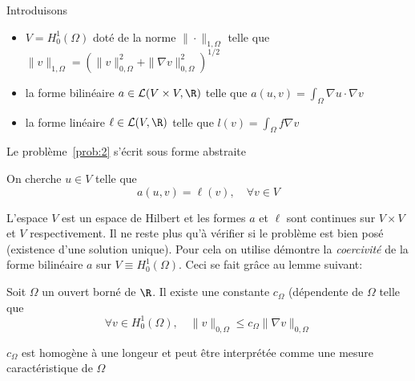 Introduisons
\begin{itemize}
\item $V = H^1_0(\Omega)$ doté de la norme $\|\cdot\|_{1,\Omega}$ telle que
  $\|v\|_{1,\Omega} = (\|v\|^2_{0,\Omega} + \|\nabla v\|^2_{0,\Omega})^{1/2}$
\item la forme bilinéaire $a \in \mathcal{L}(V \times V, \R)$ telle que $a(u,v) = \int_\Omega
  \nabla u \cdot \nabla v $
\item la forme linéaire $\ell \in \mathcal{L}(V, \R)$ telle que $l(v) = \int_\Omega
  f \nabla v $
\end{itemize}

Le problème~\ref{prob:2} s'écrit sous forme abstraite
\begin{problem}
  \label{prob:5}
  On cherche $u \in V$ telle que
  \begin{equation}
    \label{eq:65}
    a(u, v) = \ell(v), \quad \forall v \in V
  \end{equation}
\end{problem}

L'espace $V$ est un espace de Hilbert et les formes $a$ et $\ell$ sont
continues sur $V\times V$ et $V$ respectivement. Il ne reste plus qu'à
vérifier si le problème est bien posé (existence d'une solution unique). Pour
cela on utilise démontre la \emph{coercivité} de la forme bilinéaire $a$ sur
$V \equiv H^1_0(\Omega)$. Ceci se fait grâce au lemme suivant:
\begin{lemma}
  \label{lem:1}
  Soit $\Omega$ un ouvert borné de $\R$. Il existe une constante $c_\Omega$
  (dépendente de $\Omega$ telle que
  \begin{equation}
    \label{eq:66}
    \forall v \in H^1_0(\Omega),\quad \|v\|_{0,\Omega} \le c_\Omega \|\nabla v\|_{0,\Omega}
  \end{equation}
\end{lemma}
\begin{remark}
  \label{rem:24}
  $c_\Omega$ est homogène à une longeur et peut être interprétée comme une
  mesure caractéristique de $\Omega$
\end{remark}

